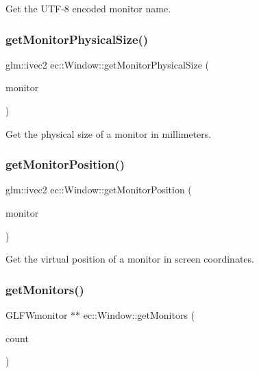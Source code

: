 Get the U\+T\+F-\/8 encoded monitor name. \mbox{\label{classec_1_1_window_ace0f9940b132f4c072e1b2a1a6f72217}} 
\subsubsection{\texorpdfstring{get\+Monitor\+Physical\+Size()}{getMonitorPhysicalSize()}}
{\footnotesize\ttfamily glm\+::ivec2 ec\+::\+Window\+::get\+Monitor\+Physical\+Size (\begin{DoxyParamCaption}\item[{G\+L\+F\+Wmonitor $\ast$}]{monitor }\end{DoxyParamCaption})\hspace{0.3cm}{\ttfamily [static]}}

Get the physical size of a monitor in millimeters. \mbox{\label{classec_1_1_window_aa7be3b867cfa6fa26f347eaa6a1d92ee}} 
\subsubsection{\texorpdfstring{get\+Monitor\+Position()}{getMonitorPosition()}}
{\footnotesize\ttfamily glm\+::ivec2 ec\+::\+Window\+::get\+Monitor\+Position (\begin{DoxyParamCaption}\item[{G\+L\+F\+Wmonitor $\ast$}]{monitor }\end{DoxyParamCaption})\hspace{0.3cm}{\ttfamily [static]}}

Get the virtual position of a monitor in screen coordinates. \mbox{\label{classec_1_1_window_a535eb59e75e88a2a9254e25f4dc878dc}} 
\subsubsection{\texorpdfstring{get\+Monitors()}{getMonitors()}}
{\footnotesize\ttfamily G\+L\+F\+Wmonitor $\ast$$\ast$ ec\+::\+Window\+::get\+Monitors (\begin{DoxyParamCaption}\item[{int $\ast$}]{count }\end{DoxyParamCaption})\hspace{0.3cm}{\ttfamily [static]}}

